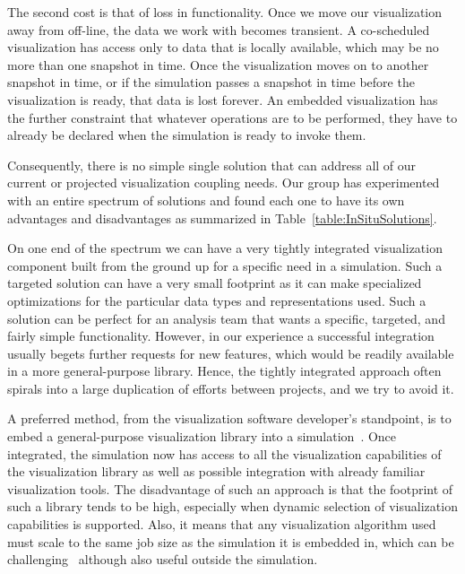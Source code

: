 \documentclass[conference]{IEEEtran}
\newcommand*{\lcite}[1]{~\cite{#1}}
\begin{document}
The second cost is that of loss in functionality.  Once we move our
visualization away from off-line, the data we work with becomes transient.
A co-scheduled visualization has access only to data that is locally
available, which may be no more than one snapshot in time.  Once the
visualization moves on to another snapshot in time, or if the simulation
passes a snapshot in time before the visualization is ready, that data is
lost forever.  An embedded visualization has the further constraint that
whatever operations are to be performed, they have to already be declared
when the simulation is ready to invoke them.

Consequently, there is no simple single solution that can address all of
our current or projected visualization coupling needs.  Our group has
experimented with an entire spectrum of solutions and found each one to
have its own advantages and disadvantages as summarized in
Table~\ref{table:InSituSolutions}.

On one end of the spectrum we can have a very tightly integrated
visualization component built from the ground up for a specific need in a
simulation.  Such a targeted solution can have a very small footprint as it
can make specialized optimizations for the particular data types and
representations used.  Such a solution can be perfect for an analysis team
that wants a specific, targeted, and fairly simple functionality.  However,
in our experience a successful integration usually begets further requests
for new features, which would be readily available in a more
general-purpose library.  Hence, the tightly integrated approach often
spirals into a large duplication of efforts between projects, and we try to
avoid it.

A preferred method, from the visualization software developer's standpoint,
is to embed a general-purpose visualization library into a
simulation\lcite{Fabian2011,VisItLibsim}.  Once integrated, the simulation
now has access to all the visualization capabilities of the visualization
library as well as possible integration with already familiar visualization
tools.  The disadvantage of such an approach is that the footprint of such
a library tends to be high, especially when dynamic selection of
visualization capabilities is supported.  Also, it means that any
visualization algorithm used must scale to the same job size as the
simulation it is embedded in, which can be challenging\lcite{Fabian2012}
although also useful outside the simulation.
\end{document}
